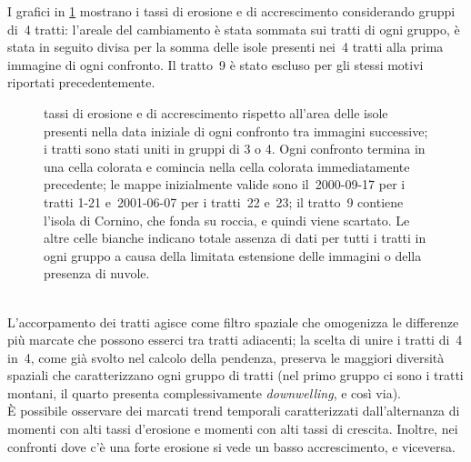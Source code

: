 I grafici in \cref{graph:eros-accr-4tr-matrix} mostrano i tassi di erosione e di accrescimento considerando gruppi di~4 tratti: l'areale del cambiamento è stata sommata sui tratti di ogni gruppo, è stata in seguito divisa per la somma delle isole presenti nei~4 tratti alla prima immagine di ogni confronto.
Il tratto~9 è stato escluso per gli stessi motivi riportati precedentemente.
%
\begin{figure}
	\centering
	
	\caption[tassi di erosione e di accrescimento unendo i tratti 4 a 4]{tassi di erosione e di accrescimento rispetto all'area delle isole presenti nella data iniziale di ogni confronto tra immagini successive; i tratti sono stati uniti in gruppi di 3 o 4.
	Ogni confronto termina in una cella colorata e comincia nella cella colorata immediatamente precedente; le mappe inizialmente valide sono il~2000-09-17 per i tratti 1-21 e~2001-06-07 per i tratti~22 e~23; il tratto~9 contiene l'isola di Cornino, che fonda su roccia, e quindi viene scartato.
	Le altre celle bianche indicano totale assenza di dati per tutti i tratti in ogni gruppo a causa della limitata estensione delle immagini o della presenza di nuvole.}
	\label{graph:eros-accr-4tr-matrix}
\end{figure}
%
\\
L'accorpamento dei tratti agisce come filtro spaziale che omogenizza le differenze più marcate che possono esserci tra tratti adiacenti; la scelta di unire i tratti di~4 in~4, come già svolto nel calcolo della pendenza, preserva le maggiori diversità spaziali che caratterizzano ogni gruppo di tratti (nel primo gruppo ci sono i tratti montani, il quarto presenta complessivamente \emph{downwelling}, e così via).
\\
È possibile osservare dei marcati trend temporali caratterizzati dall'alternanza di momenti con alti tassi d'erosione e momenti con alti tassi di crescita.
Inoltre, nei confronti dove c'è una forte erosione si vede un basso accrescimento, e viceversa.

